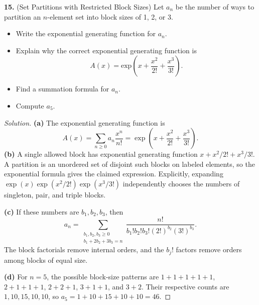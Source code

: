 \documentclass[12pt]{amsart}
\newenvironment{solution}
{\begin{proof}[Solution]}
{\end{proof}}
\begin{document}
\begin{onehalfspace}
        \noindent\textbf{15.} (Set Partitions with Restricted Block Sizes) Let $a_n$ be the number
        of ways to partition an $n$-element set into block sizes of 1, 2, or 3.
        \begin{itemize}
            \item[(a)] Write the exponential generating function for $a_n$.
            \item[(b)] Explain why the correct exponential generating function is
            \[
                A(x) = \text{exp}\left(x  + \frac{x^2}{2!} + \frac{x^3}{3!}\right).
            \]
            \item[(c)] Find a summation formula for $a_n$.
            \item[(d)] Compute $a_5$.
        \end{itemize}

        \begin{solution}
            \textbf{(a)} The exponential generating function is
            \[
                A(x)=\sum_{n\ge0}a_n\frac{x^n}{n!}
                    =\exp\left(x+\frac{x^2}{2!}+\frac{x^3}{3!}\right).
            \]
            \textbf{(b)} A single allowed block has exponential generating
            function $x+x^2/2!+x^3/3!$. A partition is an unordered set
            of disjoint such blocks on labeled elements, so the exponential
            formula gives the claimed expression. Explicitly, expanding
            $\exp(x)\exp(x^2/2!)\exp(x^3/3!)$ independently chooses the
            numbers of singleton, pair, and triple blocks.

            \textbf{(c)} If these numbers are $b_1,b_2,b_3$, then
            \[
                a_n=\sum_{\substack{b_1,b_2,b_3\ge0\\b_1+2b_2+3b_3=n}}
                    \frac{n!}{b_1!b_2!b_3!(2!)^{b_2}(3!)^{b_3}}.
            \]
            The block factorials remove internal orders, and the $b_j!$
            factors remove orders among blocks of equal size.

            \textbf{(d)} For $n=5$, the possible block-size patterns are
            $1+1+1+1+1$, $2+1+1+1$, $2+2+1$, $3+1+1$, and $3+2$.
            Their respective counts are $1,10,15,10,10$, so
            $a_5=1+10+15+10+10=46$.
        \end{solution}

    \end{onehalfspace}
\end{document}
